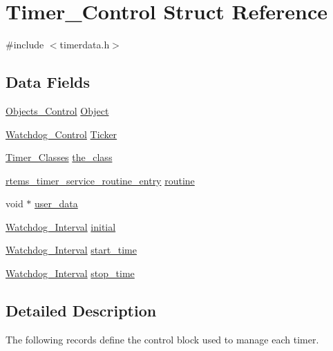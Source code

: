 \hypertarget{structTimer__Control}{}\section{Timer\+\_\+\+Control Struct Reference}
\label{structTimer__Control}


{\ttfamily \#include $<$timerdata.\+h$>$}

\subsection*{Data Fields}
\begin{DoxyCompactItemize}
\item 
\mbox{\hyperlink{structObjects__Control}{Objects\+\_\+\+Control}} \mbox{\hyperlink{structTimer__Control_ac52a39fd9574c2b645f46c95c62cfe06}{Object}}
\item 
\mbox{\hyperlink{structWatchdog__Control}{Watchdog\+\_\+\+Control}} \mbox{\hyperlink{structTimer__Control_af8273d326d21dce1423b3e5d2fb91f88}{Ticker}}
\item 
\mbox{\hyperlink{group__ClassicTimer_gaca88ac1e833f63ec72d38e07677f2f27}{Timer\+\_\+\+Classes}} \mbox{\hyperlink{structTimer__Control_a171f8c6a229c8e164a6afcea60eddbf8}{the\+\_\+class}}
\item 
\mbox{\hyperlink{group__ClassicTimer_gab7851346dd520066ddc58a25de671f51}{rtems\+\_\+timer\+\_\+service\+\_\+routine\+\_\+entry}} \mbox{\hyperlink{structTimer__Control_ac0cd6a66f0e6ca0dea7d3fad029e6750}{routine}}
\item 
void $\ast$ \mbox{\hyperlink{structTimer__Control_acb492bec9d582d0b5d68b9746f8837b5}{user\+\_\+data}}
\item 
\mbox{\hyperlink{group__RTEMSScoreWatchdog_gaa1834fd7531ca9bb5c4ca6fd990388d5}{Watchdog\+\_\+\+Interval}} \mbox{\hyperlink{structTimer__Control_ac4117b72be2935549e329123b4236f73}{initial}}
\item 
\mbox{\hyperlink{group__RTEMSScoreWatchdog_gaa1834fd7531ca9bb5c4ca6fd990388d5}{Watchdog\+\_\+\+Interval}} \mbox{\hyperlink{structTimer__Control_a7589eaff505e5136ca37447275e76948}{start\+\_\+time}}
\item 
\mbox{\hyperlink{group__RTEMSScoreWatchdog_gaa1834fd7531ca9bb5c4ca6fd990388d5}{Watchdog\+\_\+\+Interval}} \mbox{\hyperlink{structTimer__Control_a001a34f5da3d8f5c32aa1dd915036238}{stop\+\_\+time}}
\end{DoxyCompactItemize}


\subsection{Detailed Description}
The following records define the control block used to manage each timer. 

